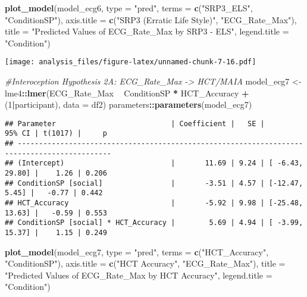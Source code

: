 \documentclass[
]{article}
\newenvironment{Shaded}{\begin{snugshade}}{\end{snugshade}}
\newcommand{\CommentTok}[1]{\textcolor[rgb]{0.56,0.35,0.01}{\textit{#1}}}
\newcommand{\DataTypeTok}[1]{\textcolor[rgb]{0.13,0.29,0.53}{#1}}
\newcommand{\DecValTok}[1]{\textcolor[rgb]{0.00,0.00,0.81}{#1}}
\newcommand{\KeywordTok}[1]{\textcolor[rgb]{0.13,0.29,0.53}{\textbf{#1}}}
\newcommand{\NormalTok}[1]{#1}
\newcommand{\OperatorTok}[1]{\textcolor[rgb]{0.81,0.36,0.00}{\textbf{#1}}}
\newcommand{\StringTok}[1]{\textcolor[rgb]{0.31,0.60,0.02}{#1}}
\begin{document}
\begin{Shaded}
\begin{Highlighting}[]
\KeywordTok{plot_model}\NormalTok{(model_ecg6, }\DataTypeTok{type =} \StringTok{"pred"}\NormalTok{, }\DataTypeTok{terms =} \KeywordTok{c}\NormalTok{(}\StringTok{"SRP3_ELS"}\NormalTok{, }\StringTok{"ConditionSP"}\NormalTok{), }\DataTypeTok{axis.title =} \KeywordTok{c}\NormalTok{(}\StringTok{"SRP3 (Erratic Life Style)"}\NormalTok{, }\StringTok{"ECG_Rate_Max"}\NormalTok{), }\DataTypeTok{title =} \StringTok{"Predicted Values of ECG_Rate_Max by SRP3 - ELS"}\NormalTok{, }\DataTypeTok{legend.title =} \StringTok{"Condition"}\NormalTok{)}
\end{Highlighting}
\end{Shaded}

\texttt{[image: analysis\_files/figure-latex/unnamed-chunk-7-16.pdf]}

\begin{Shaded}
\begin{Highlighting}[]
\CommentTok{#Interoception Hypothesis 2A: ECG_Rate_Max -> HCT/MAIA}
\NormalTok{model_ecg7 <-}\StringTok{ }\NormalTok{lme4}\OperatorTok{::}\KeywordTok{lmer}\NormalTok{(ECG_Rate_Max }\OperatorTok{~}\StringTok{ }\NormalTok{ConditionSP }\OperatorTok{*}\StringTok{ }\NormalTok{HCT_Accuracy }\OperatorTok{+}\StringTok{ }\NormalTok{(}\DecValTok{1}\OperatorTok{|}\NormalTok{participant), }\DataTypeTok{data =}\NormalTok{ df2)}
\NormalTok{parameters}\OperatorTok{::}\KeywordTok{parameters}\NormalTok{(model_ecg7)}
\end{Highlighting}
\end{Shaded}

\begin{verbatim}
## Parameter                           | Coefficient |   SE |          95% CI | t(1017) |     p
## --------------------------------------------------------------------------------------------
## (Intercept)                         |       11.69 | 9.24 | [ -6.43, 29.80] |    1.26 | 0.206
## ConditionSP [social]                |       -3.51 | 4.57 | [-12.47,  5.45] |   -0.77 | 0.442
## HCT_Accuracy                        |       -5.92 | 9.98 | [-25.48, 13.63] |   -0.59 | 0.553
## ConditionSP [social] * HCT_Accuracy |        5.69 | 4.94 | [ -3.99, 15.37] |    1.15 | 0.249
\end{verbatim}

\begin{Shaded}
\begin{Highlighting}[]
\KeywordTok{plot_model}\NormalTok{(model_ecg7, }\DataTypeTok{type =} \StringTok{"pred"}\NormalTok{, }\DataTypeTok{terms =} \KeywordTok{c}\NormalTok{(}\StringTok{"HCT_Accuracy"}\NormalTok{, }\StringTok{"ConditionSP"}\NormalTok{), }\DataTypeTok{axis.title =} \KeywordTok{c}\NormalTok{(}\StringTok{"HCT Accuracy"}\NormalTok{, }\StringTok{"ECG_Rate_Max"}\NormalTok{), }\DataTypeTok{title =} \StringTok{"Predicted Values of ECG_Rate_Max by HCT Accuracy"}\NormalTok{, }\DataTypeTok{legend.title =} \StringTok{"Condition"}\NormalTok{)}
\end{Highlighting}
\end{Shaded}
\end{document}
